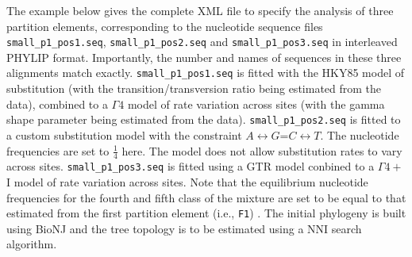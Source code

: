 \documentclass[a4paper,12pt]{article}
\newcommand{\x}[1]{\texttt{#1}}
\begin{document}
The example below gives  the complete XML file to specify the analysis  of three partition elements,
corresponding to the nucleotide  sequence files \x{small\_p1\_pos1.seq}, \x{small\_p1\_pos2.seq} and
\x{small\_p1\_pos3.seq} in  interleaved PHYLIP  format. Importantly, the number and names of
sequences in these three alignments match exactly. \x{small\_p1\_pos1.seq}  is fitted  with the
HKY85 model of substitution (with the  transition/transversion ratio being estimated from the data),
combined to a $\Gamma4$  model of rate variation across sites (with the  gamma shape parameter being
estimated from the data).  \x{small\_p1\_pos2.seq} is fitted to a custom substitution model with the
constraint  $A\leftrightarrow  G$=$C\leftrightarrow  T$.  The  nucleotide  frequencies  are  set  to
$\frac{1}{4}$   here.    The   model   does   not  allow   substitution   rates   to   vary   across
sites. \x{small\_p1\_pos3.seq} is fitted  using a GTR model conbined to a  $\Gamma4+$I model of rate
variation across sites.  Note that the equilibrium  nucleotide frequencies for the  fourth and fifth
class of the mixture are  set to be equal to that estimated from  the first partition element (i.e.,
\x{F1}) . The initial phylogeny is built using BioNJ  and the tree topology is to be estimated using
a NNI search algorithm.
\end{document}
